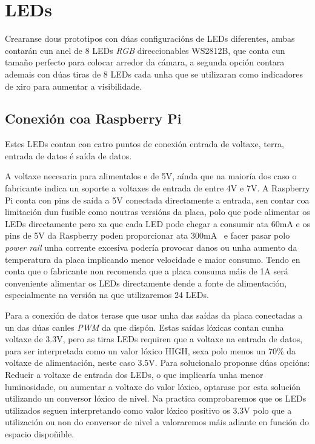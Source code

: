 \section{LEDs}

Crearanse dous prototipos con dúas configuracións de LEDs diferentes, ambas contarán cun anel de 8 LEDs \emph{RGB} direccionables WS2812B, que conta cun tamaño perfecto para colocar arredor da cámara, a segunda opción contara ademais con dúas tiras de 8 LEDs cada unha que se utilizaran como indicadores de xiro para aumentar a visibilidade.
\subsection{Conexión coa Raspberry Pi}
Estes LEDs contan con catro puntos de conexión entrada de voltaxe, terra, entrada de datos é saída de datos.

A voltaxe necesaria para alimentalos e de 5V, aínda que na maioría dos caso o fabricante indica un soporte a voltaxes de entrada de entre 4V e 7V. A Raspberry Pi conta con pins de saída a 5V conectada directamente a entrada, sen contar coa limitación dun fusible como noutras versións da placa, polo que pode alimentar os LEDs directamente pero xa que cada LED pode chegar a consumir ata 60mA e os pins de 5V da Raspberry poden proporcionar ata 300mA~\cite{molloyRaspberryPiFondo2018} e facer pasar polo \emph{power rail} unha corrente excesiva podería provocar danos ou unha aumento da temperatura da placa implicando menor velocidade e maior consumo. Tendo en conta que o fabricante non recomenda que a placa consuma máis de 1A será conveniente alimentar os LEDs directamente dende a fonte de alimentación, especialmente na versión na que utilizaremos 24 LEDs.

Para a conexión de datos terase que usar unha das saídas da placa conectadas a un das dúas canles \emph{PWM} da que dispón. Estas saídas lóxicas contan cunha voltaxe de 3.3V, pero as tiras LEDs requiren que a voltaxe na entrada de datos, para ser interpretada como un valor lóxico HIGH, sexa polo menos un 70\(\%\) da  voltaxe de alimentación, neste caso 3.5V. Para solucionalo proponse dúas opcións: Reducir a voltaxe de entrada dos LEDs, o que implicaría unha menor luminosidade, ou aumentar a voltaxe do valor lóxico, optarase por esta solución utilizando un conversor lóxico de nivel. Na practica comprobaremos que os LEDs utilizados seguen interpretando como valor lóxico positivo os 3.3V polo que a utilización ou non do conversor de nivel a valoraremos máis adiante en función do espacio dispoñible.

